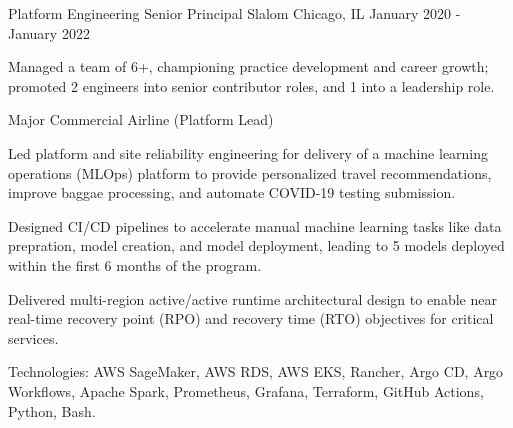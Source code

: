 \begin{cventries}
  \cventry
    {Platform Engineering Senior Principal} %
    {Slalom} %
    {Chicago, IL} %
    {January 2020 - January 2022} %
    {
      \begin{cvitems} %
        \item {Managed a team of 6+, championing practice development and career growth; promoted 2 engineers into senior contributor roles, and 1 into a leadership role.}
      \end{cvitems}
    }

  \cventry
    {Major Commercial Airline (Platform Lead)} %
    {} %
    {} %
    {} %
    {
      \begin{cvitems} %
        \item {Led platform and site reliability engineering for delivery of a machine learning operations (MLOps) platform to provide personalized travel recommendations, improve baggae processing, and automate COVID-19 testing submission.}
        \item {Designed CI/CD pipelines to accelerate manual machine learning tasks like data prepration, model creation, and model deployment, leading to 5 models deployed within the first 6 months of the program.}
        \item {Delivered multi-region active/active runtime architectural design to enable near real-time recovery point (RPO) and recovery time (RTO) objectives for critical services.}
        \item {Technologies: AWS SageMaker, AWS RDS, AWS EKS, Rancher, Argo CD, Argo Workflows, Apache Spark, Prometheus, Grafana, Terraform, GitHub Actions, Python, Bash.}
      \end{cvitems}
    }


\end{cventries}
